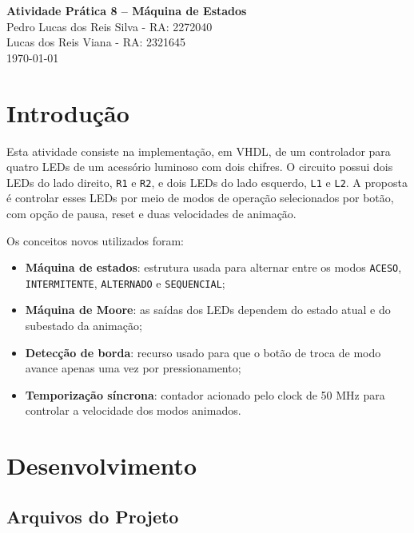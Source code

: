 \documentclass[12pt,a4paper, brazil]{article}
\begin{document}
\begin{center}
{\textbf {\huge Atividade Prática 8 -- Máquina de Estados}}\\[5mm]
{\large Pedro Lucas dos Reis Silva - RA: 2272040} \\[5mm]
{\large Lucas dos Reis Viana - RA: 2321645} \\[5mm]
\today\\[5mm]
\end{center}

\section{Introdução}

Esta atividade consiste na implementação, em VHDL, de um controlador para quatro LEDs de um acessório luminoso com dois chifres. O circuito possui dois LEDs do lado direito, \texttt{R1} e \texttt{R2}, e dois LEDs do lado esquerdo, \texttt{L1} e \texttt{L2}. A proposta é controlar esses LEDs por meio de modos de operação selecionados por botão, com opção de pausa, reset e duas velocidades de animação.

Os conceitos novos utilizados foram:

\begin{itemize}
    \item \textbf{Máquina de estados}: estrutura usada para alternar entre os modos \texttt{ACESO}, \texttt{INTERMITENTE}, \texttt{ALTERNADO} e \texttt{SEQUENCIAL};
    \item \textbf{Máquina de Moore}: as saídas dos LEDs dependem do estado atual e do subestado da animação;
    \item \textbf{Detecção de borda}: recurso usado para que o botão de troca de modo avance apenas uma vez por pressionamento;
    \item \textbf{Temporização síncrona}: contador acionado pelo clock de 50 MHz para controlar a velocidade dos modos animados.
\end{itemize}

\section{Desenvolvimento}

\subsection{Arquivos do Projeto}
\end{document}
